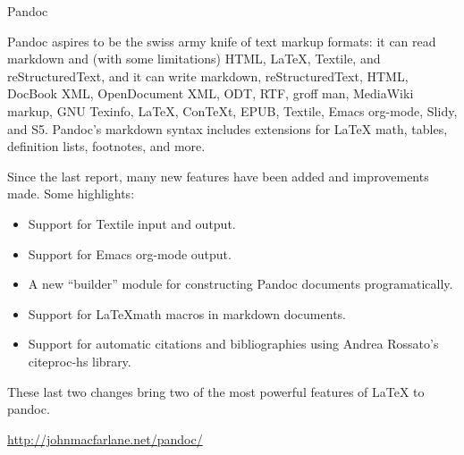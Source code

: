 \begin{hcarentry}[updated]{Pandoc}
\label{pandoc}
\makeheader

Pandoc aspires to be the swiss army knife of text markup formats: it
can read markdown and (with some limitations) HTML, LaTeX, Textile, and
reStructuredText, and it can write markdown, reStructuredText, HTML,
DocBook XML, OpenDocument XML, ODT, RTF, groff man, MediaWiki markup,
GNU Texinfo, LaTeX, ConTeXt, EPUB, Textile, Emacs org-mode,
Slidy, and S5. Pandoc's markdown syntax includes extensions for LaTeX math,
tables, definition lists, footnotes, and more.

Since the last report, many new features have been added and improvements
made.  Some highlights:
\begin{itemize}
\item Support for Textile input and output.
\item Support for Emacs org-mode output.
\item A new ``builder'' module for constructing Pandoc documents programatically.
\item Support for \LaTeX math macros in markdown documents.
\item Support for automatic citations and bibliographies using Andrea
Rossato's citeproc-hs library.
\end{itemize}

These last two changes bring two of the most powerful features of \LaTeX
to pandoc.

\FurtherReading
    \url{http://johnmacfarlane.net/pandoc/}
\end{hcarentry}
